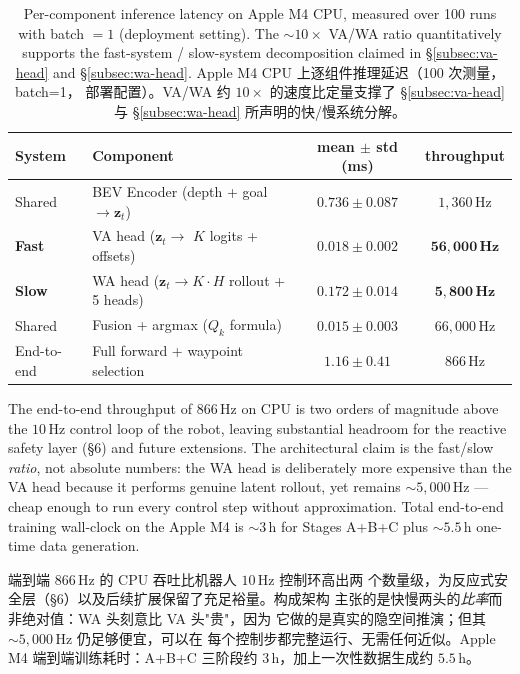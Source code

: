 \documentclass[11pt,a4paper]{article}
\newcommand{\en}[1]{\par\noindent #1\par\vspace{0.15em}}
\newcommand{\zh}[1]{\par\noindent\color{zhcol}\hspace{0.5em}#1\par\color{black}\vspace{0.6em}}
\newcommand{\bz}{\mathbf{z}}
\begin{document}
\begin{table}[H]
\centering\small
\caption{Per-component inference latency on Apple M4 CPU, measured over
100 runs with batch $=1$ (deployment setting). The
$\sim 10\times$ VA/WA ratio quantitatively supports the fast-system /
slow-system decomposition claimed in \S\ref{subsec:va-head} and
\S\ref{subsec:wa-head}.
\textsf{\small Apple M4 CPU 上逐组件推理延迟（100 次测量，batch=1，
部署配置）。VA/WA 约 $10\times$ 的速度比定量支撑了
\S\ref{subsec:va-head} 与 \S\ref{subsec:wa-head} 所声明的快/慢系统分解。}}
\label{tab:latency-breakdown}
\begin{tabular}{llcc}
\toprule
System & Component & mean $\pm$ std (ms) & throughput \\
\midrule
Shared & BEV Encoder (depth + goal $\to \bz_t$)        & $0.736 \pm 0.087$ & $1{,}360\,$Hz \\
\textbf{Fast} & VA head ($\bz_t \to$ $K$ logits + offsets) & $\mathbf{0.018 \pm 0.002}$ & $\mathbf{56{,}000\,\text{Hz}}$ \\
\textbf{Slow} & WA head ($\bz_t \to K{\cdot}H$ rollout + 5 heads) & $\mathbf{0.172 \pm 0.014}$ & $\mathbf{5{,}800\,\text{Hz}}$ \\
Shared & Fusion + argmax ($Q_k$ formula)              & $0.015 \pm 0.003$ & $66{,}000\,$Hz \\
\midrule
End-to-end & Full forward + waypoint selection        & $1.16 \pm 0.41$ & $866\,$Hz \\
\bottomrule
\end{tabular}
\end{table}

\en{The end-to-end throughput of $866\,$Hz on CPU is two orders of
magnitude above the $10\,$Hz control loop of the robot, leaving
substantial headroom for the reactive safety layer (\S6) and future
extensions. The architectural claim is the fast/slow \emph{ratio}, not
absolute numbers: the WA head is deliberately more expensive than the
VA head because it performs genuine latent rollout, yet remains
$\sim 5{,}000\,$Hz — cheap enough to run every control step without
approximation. Total end-to-end training wall-clock on the Apple M4
is $\sim 3\,$h for Stages A+B+C plus $\sim 5.5\,$h one-time data
generation.}

\zh{\textsf{端到端 $866\,$Hz 的 CPU 吞吐比机器人 $10\,$Hz 控制环高出两
个数量级，为反应式安全层（\S6）以及后续扩展保留了充足裕量。构成架构
主张的是快慢两头的\emph{比率}而非绝对值：WA 头刻意比 VA 头"贵"，因为
它做的是真实的隐空间推演；但其 $\sim 5{,}000\,$Hz 仍足够便宜，可以在
每个控制步都完整运行、无需任何近似。Apple M4 端到端训练耗时：A+B+C
三阶段约 $3\,$h，加上一次性数据生成约 $5.5\,$h。}}
\end{document}
